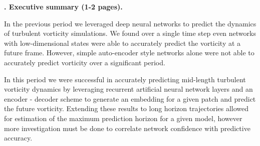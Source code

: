 \documentclass[12pt]{article}
\newcounter{DarpaSecCounter}
\renewcommand{\section}[1]{\stepcounter{DarpaSecCounter}\vspace{15pt}\noindent\textbf{{\theDarpaSecCounter.} #1}\vspace{3pt}}
\newcounter{DarpaSubSecCounter}[DarpaSecCounter]
\renewcommand{\subsection}[1]{\vspace{4pt}\stepcounter{DarpaSubSecCounter}\indent\textbf{\theDarpaSecCounter.\theDarpaSubSecCounter. #1.}}
\newcounter{DarpaSubSubSecCounter}[DarpaSubSecCounter]
\renewcommand{\subsubsection}[1]{\vspace{2pt}\stepcounter{DarpaSubSubSecCounter}\indent\textbf{\theDarpaSecCounter.\theDarpaSubSecCounter.\theDarpaSubSubSecCounter.} \emph{#1}}
\theoremstyle{plain}
\theoremstyle{remark}
\theoremstyle{definition}
\begin{document}
\newpage

\section{Executive summary (1-2 pages).} 

In the previous period we leveraged deep neural networks to predict the dynamics of turbulent vorticity simulations. We found over a single time step even networks with low-dimensional states were able to accurately predict the vorticity at a future frame. However, simple auto-encoder style networks alone were not able to accurately predict vorticity over a significant period.


In this period we were successful in accurately predicting mid-length turbulent vorticity dynamics by leveraging recurrent artificial neural network layers and an encoder - decoder scheme to generate an embedding for a given patch and predict the future vorticity. Extending these results to long horizon trajectories allowed for estimation of the maximum prediction horizon for a given model, however more investigation must be done to correlate network confidence with predictive accuracy.



\end{document}
